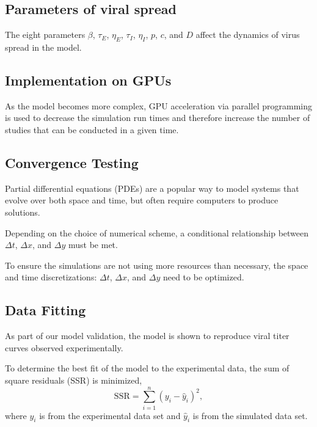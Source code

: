 \subsection{Parameters of viral spread}

The eight parameters $\beta$, $\tau_E$, $\eta_E$, $\tau_I$, $\eta_I$, $p$, $c$, and $D$ affect the dynamics of virus spread in the model. 

\subsection{Implementation on GPUs}

As the model becomes more complex, GPU acceleration via parallel programming is used to decrease the simulation run times and therefore increase the number of studies that can be conducted in a given time. 

\subsection{Convergence Testing}

Partial differential equations (PDEs) are a popular way to model systems that evolve over both space and time, but often require computers to produce solutions. 

Depending on the choice of numerical scheme, a conditional relationship between $\Delta t$, $\Delta x$, and $\Delta y$ must be met. 

To ensure the simulations are not using more resources than necessary, the space and time discretizations: $\Delta t$, $\Delta x$, and $\Delta y$ need to be optimized. 

\subsection{Data Fitting} \label{Data_Fitting}

As part of our model validation, the model is shown to reproduce viral titer curves observed experimentally. 

To determine the best fit of the model to the experimental data, the sum of square residuals (SSR) is minimized, $$\mathrm{SSR} = \sum_{i=1}^{n} (y_i - \hat y_i)^{2},$$ where $y_i$ is from the experimental data set and $\hat y_i$ is from the simulated data set. 


